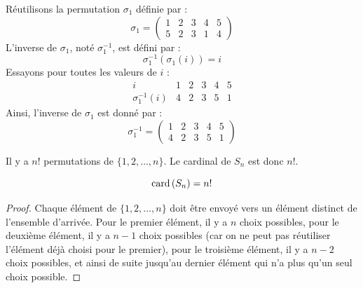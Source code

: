 \documentclass[12pt, a4paper]{report}
\begin{document}
\begin{example}
    Réutilisons la permutation $\sigma_1$ définie par :
    $$
\sigma_1 = \left(\begin{matrix} 1 & 2 & 3 & 4 & 5 \\ 5 & 2 & 3 & 1 & 4 \end{matrix}\right)
    $$
    L'inverse de $\sigma_1$, noté $\sigma_1^{-1}$, est défini par :
    $$
\sigma_1^{-1}(\sigma_1(i)) = i
    $$
    Essayons pour toutes les valeurs de $i$ :
    \[
\begin{array}{c|ccccc}
    i & 1 & 2 & 3 & 4 & 5 \\
    \sigma_1^{-1}(i) & 4 & 2 & 3 & 5 & 1
\end{array}
    \]
    Ainsi, l'inverse de $\sigma_1$ est donné par :
    $$
\sigma_1^{-1} = \left(\begin{matrix} 1 & 2 & 3 & 4 & 5 \\ 4 & 2 & 3 & 5 & 1 \end{matrix}\right)
    $$
\end{example}

\begin{property}
    Il y a $n!$ permutations de $\{1, 2, \dots, n\}$. Le cardinal de $S_n$ est donc $n!$.

    $$\mathrm{card}\left(S_n\right) = n!$$
\end{property}

\begin{proof}
    Chaque élément de $\{1, 2, \dots, n\}$ doit être envoyé vers un élément distinct de l'ensemble d'arrivée. Pour le premier élément, il y a $n$ choix possibles, pour le deuxième élément, il y a $n-1$ choix possibles (car on ne peut pas réutiliser l'élément déjà choisi pour le premier), pour le troisième élément, il y a $n-2$ choix possibles, et ainsi de suite jusqu'au dernier élément qui n'a plus qu'un seul choix possible.
\end{proof}
\end{document}

